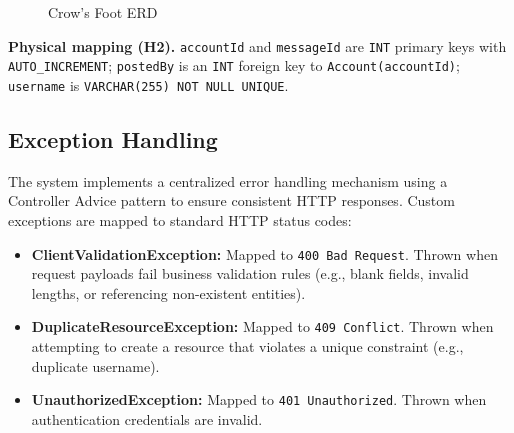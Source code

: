 \documentclass{article}
\begin{document}
\begin{figure}[htbp]
\caption{Crow's Foot ERD}
\label{fig:uml-erd}
\end{figure}

\noindent\textbf{Physical mapping (H2).} \texttt{accountId} and 
\texttt{messageId} are \texttt{INT} primary keys with 
\texttt{AUTO\_INCREMENT}; \texttt{postedBy} is an \texttt{INT} 
foreign key to \texttt{Account(accountId)}; \texttt{username} is 
\texttt{VARCHAR(255) NOT NULL UNIQUE}.

\subsection{Exception Handling}
The system implements a centralized error handling mechanism using a Controller Advice pattern to ensure consistent HTTP responses. Custom exceptions are mapped to standard HTTP status codes:
\begin{itemize}
    \item \textbf{ClientValidationException:} Mapped to \texttt{400 Bad Request}. Thrown when request payloads fail business validation rules (e.g., blank fields, invalid lengths, or referencing non-existent entities).
    \item \textbf{DuplicateResourceException:} Mapped to \texttt{409 Conflict}. Thrown when attempting to create a resource that violates a unique constraint (e.g., duplicate username).
    \item \textbf{UnauthorizedException:} Mapped to \texttt{401 Unauthorized}. Thrown when authentication credentials are invalid.
\end{itemize}
\end{document}
